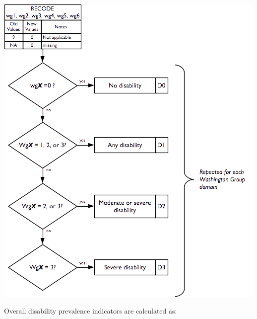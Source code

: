 \documentclass[12pt,a4paper]{book}
\theoremstyle{definition}
\theoremstyle{definition}
\theoremstyle{definition}
\theoremstyle{remark}
\begin{document}
\begin{center}\includegraphics{figures/indicators16} \end{center}

Overall disability prevalence indicators are calculated as:
\end{document}
